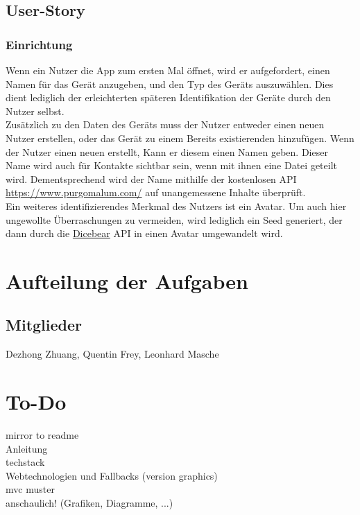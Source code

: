 \documentclass[a4paper]{article}
\begin{document}
\subsection{User-Story}

\subsubsection{Einrichtung}
Wenn ein Nutzer die App zum ersten Mal öffnet, wird er aufgefordert, einen Namen
für das Gerät anzugeben, und den Typ des Geräts auszuwählen. Dies dient lediglich
der erleichterten späteren Identifikation der Geräte durch den Nutzer selbst.\\
Zusätzlich zu den Daten des Geräts muss der Nutzer entweder einen neuen Nutzer erstellen,
oder das Gerät zu einem Bereits existierenden hinzufügen. Wenn der Nutzer einen neuen erstellt,
Kann er diesem einen Namen geben. Dieser Name wird auch für Kontakte sichtbar sein, wenn mit ihnen
eine Datei geteilt wird. Dementsprechend wird der Name mithilfe der kostenlosen API \url{
  https://www.purgomalum.com/} auf unangemessene Inhalte überprüft.\\
Ein weiteres identifizierendes Merkmal des Nutzers ist ein Avatar. Um auch hier ungewollte
Überraschungen zu vermeiden, wird lediglich ein Seed generiert, der dann durch die \href{
https://www.dicebear.com/}{Dicebear} API in einen Avatar umgewandelt wird.




\section{Aufteilung der Aufgaben}

\subsection*{Mitglieder}
Dezhong Zhuang, Quentin Frey, Leonhard Masche

\section{To-Do}
mirror to readme\\
Anleitung\\
techstack\\
Webtechnologien und Fallbacks (version graphics)\\
mvc muster\\
anschaulich! (Grafiken, Diagramme, ...)
\end{document}
